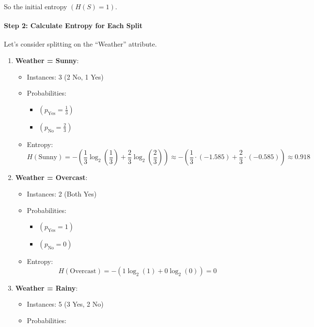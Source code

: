\documentclass[12pt]{book}
\providecommand{\tightlist}{%
  \setlength{\itemsep}{0pt}\setlength{\parskip}{0pt}}
\begin{document}
So the initial entropy \(( H(S) = 1 )\).

\paragraph{Step 2: Calculate Entropy for Each
Split}\label{step-2-calculate-entropy-for-each-split}

Let's consider splitting on the ``Weather'' attribute.

\begin{enumerate}
\def\labelenumi{\arabic{enumi}.}
\tightlist
\item
  \textbf{Weather = Sunny}:

  \begin{itemize}
  \tightlist
  \item
    Instances: 3 (2 No, 1 Yes)
  \item
    Probabilities:

    \begin{itemize}
    \tightlist
    \item
      \(( p_{\text{Yes}} = \frac{1}{3} )\)
    \item
      \(( p_{\text{No}} = \frac{2}{3} )\)
    \end{itemize}
  \item
    Entropy: \[
    H(\text{Sunny}) = -\left(\frac{1}{3} \log_2\left(\frac{1}{3}\right) + \frac{2}{3} \log_2\left(\frac{2}{3}\right)\right) \approx -\left(\frac{1}{3} \cdot (-1.585) + \frac{2}{3} \cdot (-0.585)\right) \approx 0.918
    \]
  \end{itemize}
\item
  \textbf{Weather = Overcast}:

  \begin{itemize}
  \tightlist
  \item
    Instances: 2 (Both Yes)
  \item
    Probabilities:

    \begin{itemize}
    \tightlist
    \item
      \(( p_{\text{Yes}} = 1 )\)
    \item
      \(( p_{\text{No}} = 0 )\)
    \end{itemize}
  \item
    Entropy: \[
    H(\text{Overcast}) = -\left(1 \log_2(1) + 0 \log_2(0)\right) = 0
    \]
  \end{itemize}
\item
  \textbf{Weather = Rainy}:

  \begin{itemize}
  \tightlist
  \item
    Instances: 5 (3 Yes, 2 No)
  \item
    Probabilities:


\end{itemize}
\end{enumerate}
\end{document}
